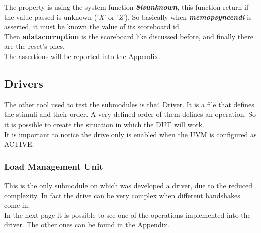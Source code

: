 The property is using the system function \textbf{\emph{\$isunknown}}, this function return if the value passed is unknown ('\emph{X}' or '\emph{Z}'). So basically when \textbf{\emph{memop\+sync\+end\+i}} is asserted, it must be known the value of its scoreboard id.\\


Then  \textbf{a\+data\+corruption} is the scoreboard like discussed before, and finally there are the reset's ones.\\
The assertions will be reported into the Appendix.\\




\subsection{Drivers}
The other tool used to test the submodules is the4 Driver. It is a file that defines the stimuli and their order. A very defined order of them defines an operation. So it is possible to create the situation in which the DUT will work.\\

It is important to notice the drive only is enabled when the UVM is configured as ACTIVE.

\subsubsection{Load Management Unit}
This is the only submodule on which was developed a driver, due to the reduced complexity. In fact the drive can be very complex when different handshakes come in.\\

In the next page it is possible to see one of the operations implemented into the driver. The other ones can be found in the Appendix.
\newpage

